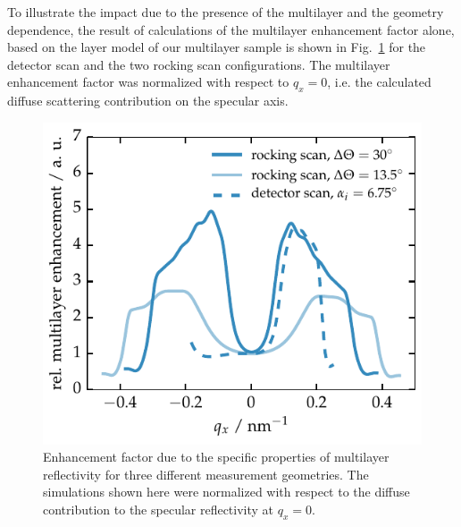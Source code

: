 To illustrate the impact due to the presence of the multilayer and the geometry dependence, the result of calculations of the multilayer enhancement factor alone, based on the layer model of our multilayer sample is shown in Fig.~\ref{ch_diff:fig_PTB17_multilayer_enhancement_factor} for the detector scan and the two rocking scan configurations. The multilayer enhancement factor was normalized with respect to $q_x=0$, i.e. the calculated diffuse scattering contribution on the specular axis.
\begin{figure}[htbp]
	\includegraphics{img/PTB17_multilayer_enhancement_factor} \caption{Enhancement factor due to the specific properties of multilayer reflectivity for three different measurement geometries. The simulations shown here were normalized with respect to the diffuse contribution to the specular reflectivity at $q_x=0$.} \label{ch_diff:fig_PTB17_multilayer_enhancement_factor} 
\end{figure}

